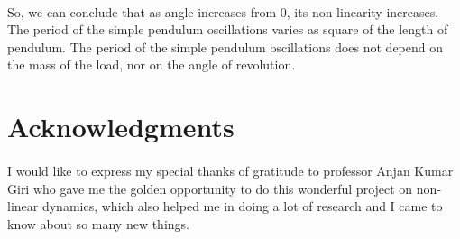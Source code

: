 \documentclass{article}
\begin{document}
\paragraph{}So, we can conclude that  as angle increases from 0, its non-linearity increases. The period of the simple pendulum oscillations varies as square of the length of pendulum. The period of the simple pendulum oscillations does not depend on the mass of the load, nor on the angle of revolution.


\section{Acknowledgments}
\paragraph{}I would like to express my special thanks of gratitude to professor Anjan Kumar Giri who gave me the golden opportunity to do this wonderful project on non-linear dynamics, which also helped me in doing a lot of research and I came to know about so many new things.
\end{document}
